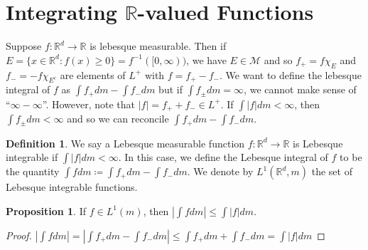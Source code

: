 \documentclass{article}
\theoremstyle{definition}
\newtheorem{definition}{Definition}[section]
\newtheorem{prop}{Proposition}[section]
\theoremstyle{remark}
\theoremstyle{remark}
\def\reals{{\mathbb R}}
\def\scriptm{{\mathcal M}}
\begin{document}
\section{Integrating $\reals$-valued Functions}
Suppose $f: \reals^d \to \reals$ is lebesque measurable. Then if $E = \{x\in \reals^d : f(x) \geq 0\} = f^{-1}([0, \infty))$, we have $E \in \scriptm$ and so $f_{+} = f\chi_E$ and $f_{-} = -f\chi_{E^c}$ are elements of $L^{+}$ with $f = f_{+} - f_{-}$. We want to define the lebesque integral of $f$ as $\int f_{+} dm - \int f_{-}dm$ but if $\int f_{\pm} dm = \infty$, we cannot make sense of ``$\infty - \infty$''. However, note that $|f| = f_{+} + f_{-} \in L^{+}$. If $\int |f|dm < \infty$, then $\int f_{\pm}dm < \infty$ and so we can reconcile $\int f_{+}dm - \int f_{-}dm$.

\begin{definition}
We say a Lebesque measurable function $f: \reals^d \to \reals$ is Lebesque integrable if $\int |f| dm < \infty$. In this case, we define the Lebesque integral of $f$ to be the quantity $\int f dm \coloneqq \int f_{+} dm - \int f_{-} dm$. We denote by $L^1(\reals^d, m)$ the set of Lebesque integrable functions.
\end{definition}
\begin{prop}
If $f\in L^1(m)$, then $|\int f dm| \leq \int |f|dm$.
\end{prop}
\begin{proof}
$|\int f dm| = | \int f_{+}dm - \int f_{-}dm| \leq \int f_{+}dm + \int f_{-}dm = \int |f| dm$
\end{proof}
\end{document}

